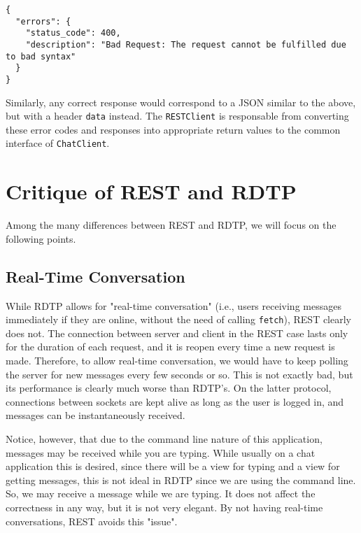 \documentclass[10pt]{article}
\begin{document}
\medskip

\begin{verbatim}
{
  "errors": {
    "status_code": 400,
    "description": "Bad Request: The request cannot be fulfilled due to bad syntax"
  }
}
\end{verbatim}

\medskip

Similarly, any correct response would correspond to a JSON similar to the above,
but with a header \verb|data| instead. The \verb|RESTClient| is responsable from
converting these error codes and responses into appropriate return values to 
the common interface of \verb|ChatClient|.

\section{Critique of REST and RDTP}

Among the many differences between REST and RDTP, we will focus on the following points.

\subsection{Real-Time Conversation}

While RDTP allows for "real-time conversation" (i.e., users receiving messages immediately
if they are online, without the need of calling \verb|fetch|), REST clearly does not. The
connection between server and client in the REST case lasts only for the duration of each
request, and it is reopen every time a new request is made. Therefore, to allow real-time
conversation, we would have to keep polling the server for new messages every few seconds or so.
This is not exactly bad, but its performance is clearly much worse than RDTP's. On the latter
protocol, connections between sockets are kept alive as long as the user is logged in, and
messages can be instantaneously received.

\medskip

Notice, however, that due to the command line nature of this application, messages may be
received while you are typing. While usually on a chat application this is desired, since
there will be a view for typing and a view for getting messages, this is not ideal in RDTP
since we are using the command line. So, we may receive a message while we are typing. It does not
affect the correctness in any way, but it is not very elegant. By not having real-time conversations,
REST avoids this "issue".
\end{document}
